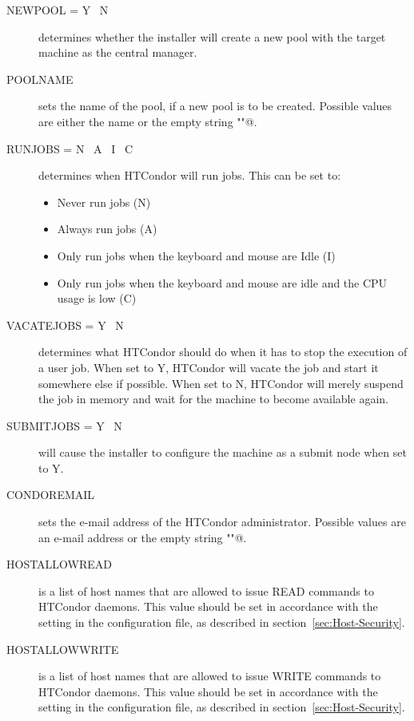 \begin{description}
\item [NEWPOOL = \lt{} Y \Bar{}\ N \gt{}]
determines whether the installer will create a new pool with the target
machine as the central manager.

\item [POOLNAME]
sets the name of the pool, if a new pool is to be created. Possible values
are either the name or the empty string \verb@""@.

\item [RUNJOBS = \lt{} N \Bar{}\ A \Bar{}\ I \Bar{}\ C \gt{}]
determines when HTCondor will run jobs. This can be set to:
\begin{itemize}
\item Never run jobs (N)
\item Always run jobs (A)
\item Only run jobs when the keyboard and mouse are Idle (I)
\item Only run jobs when the keyboard and mouse are idle and the CPU
usage is low (C)
\end{itemize}

\item [VACATEJOBS = \lt{} Y \Bar{}\ N \gt{}]
determines what HTCondor should do when it has to stop the execution of
a user job. When set to Y, HTCondor will vacate the job and start
it somewhere else if possible. When set to N, HTCondor will merely
suspend the job in memory and wait for the machine to become available
again. 

\item[SUBMITJOBS  = \lt{} Y \Bar{}\ N \gt{}]
will cause the installer to configure the machine as a submit
node when set to Y. 

\item[CONDOREMAIL]
sets the e-mail address of the HTCondor administrator. Possible values are
an e-mail address or the empty string \verb@""@.

\item[HOSTALLOWREAD]
is a list of host names that are allowed to issue READ commands to
HTCondor daemons. This value should be set in accordance with the
 setting in the configuration file, as described in
section~\ref{sec:Host-Security}.

\item[HOSTALLOWWRITE]
is a list of host names that are allowed to issue WRITE commands to
HTCondor daemons. This value should be set in accordance with the
 setting in the configuration file, as described in
section~\ref{sec:Host-Security}.


\end{description}
